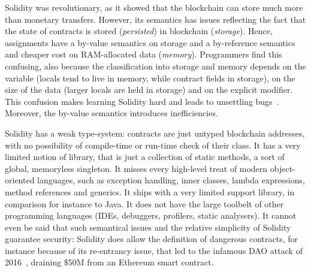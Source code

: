 \documentclass[10pt]{llncs}
\def\codesize{}
\def\<#1>{\codeid{#1}}
\newcommand{\codeid}[1]{\ifmmode{\mbox{\codesize\ttfamily{#1}}}\else{\codesize\ttfamily #1}\fi}
\begin{document}
Solidity was revolutionary, as it showed that the blockchain can
store much more than monetary transfers.
However, its semantics has issues reflecting the fact that
the state of contracts is stored
(\emph{persisted}) in blockchain (\emph{storage}). Hence, assignments have a
by-value semantics on storage and a by-reference semantics and cheaper cost
on RAM-allocated data (\emph{memory}).
Programmers find this confusing, also because
the classification into storage and memory depends on the variable
(locals tend to live in memory, while contract fields in
storage), on the size of the data (larger locals are held in storage)
and on the explicit \<storage> modifier. This confusion makes learning
Solidity hard and leads to
unsettling bugs~\cite{uninitialised_storage_pointers}. Moreover,
the by-value semantics introduces inefficiencies.

Solidity has a weak type-system: contracts
are just untyped blockchain addresses, with no possibility of
compile-time or run-time check of their class.
It has a very limited notion of library, that is just
a collection of static methods,
a sort of global, memoryless singleton.
It misses every high-level treat of modern object-oriented languages,
such as exception handling,
inner classes, lambda expressions, method references and generics.
It ships with a very limited support library, in comparison for
instance to Java. It does not have the large toolbelt of
other programming languages (IDEs, debuggers, profilers,
static analysers).
It cannot even be said that such semantical issues and the
relative simplicity of Solidity
guarantee security: Solidity does
allow the definition of dangerous contracts, for
instance because of its re-entrancy issue, that led to the
infamous DAO attack of 2016~\cite{dao16},
draining \$50M from an Ethereum smart contract.
\end{document}
